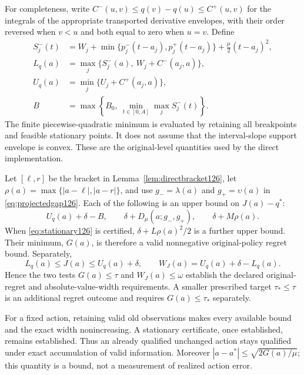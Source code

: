 For completeness, write $C^-(u,v)\le q(v)-q(u)\le C^+(u,v)$ for
the integrals of the appropriate transported derivative envelopes,
with their order reversed when $v<u$ and both equal to zero when
$u=v$.  Define
\begin{align*}
 S_j^-(t)&=W_j+\min\{p_j^-(t-a_j),p_j^+(t-a_j)\}
                         +\frac\mu2(t-a_j)^2,\\
 L_q(a)&=\max_j\{S_j^-(a),\ W_j+C^-(a_j,a)\},\\
 U_q(a)&=\min_j\{U_j+C^+(a_j,a)\},\\
 B&=\max\left\{B_0,\ \min_{t\in[0,A]}\max_j S_j^-(t)\right\}.
\end{align*}
The finite piecewise-quadratic minimum is evaluated by retaining all
breakpoints and feasible stationary points.  It does not assume that
the interval-slope support envelope is convex.  These are the
original-level quantities used by the direct implementation.

\begin{proposition}
\label{prop:directcertificate126}
Let $[\ell,r]$ be the bracket in Lemma~\ref{lem:directbracket126},
let $\rho(a)=\max\{|a-\ell|,|a-r|\}$, and use
$g_-=\lambda(a)$ and $g_+=\upsilon(a)$ in
\eqref{eq:projectedgap126}.  Each of the following is an upper bound
on $J(a)-q^*$:
\begin{equation}\label{eq:directroutes126}
 U_q(a)+\delta-B,\qquad
 \delta+D_\mu(a;g_-,g_+),\qquad
 \delta+M\rho(a).
\end{equation}
When \eqref{eq:stationary126} is certified,
$\delta+L\rho(a)^2/2$ is a further upper bound.  Their minimum,
$G(a)$, is therefore a valid nonnegative original-policy regret bound.
Separately,
\begin{equation}\label{eq:directlevel126}
 L_q(a)\le J(a)\le U_q(a)+\delta,
 \qquad W_J(a)=U_q(a)+\delta-L_q(a).
\end{equation}
Hence the two tests $G(a)\le\tau$ and $W_J(a)\le\omega$ establish
the declared original-regret and absolute-value-width requirements.
A smaller prescribed target $\tau_*\le\tau$ is an additional
regret outcome and requires $G(a)\le\tau_*$ separately.

For a fixed action, retaining valid old observations makes every
available bound and the exact width nonincreasing.  A stationary
certificate, once established, remains established.  Thus an already
qualified unchanged action stays qualified under exact accumulation
of valid information.  Moreover
$|a-a^*|\le\sqrt{2G(a)/\mu}$; this quantity is a bound, not a
measurement of realized action error.
\end{proposition}

